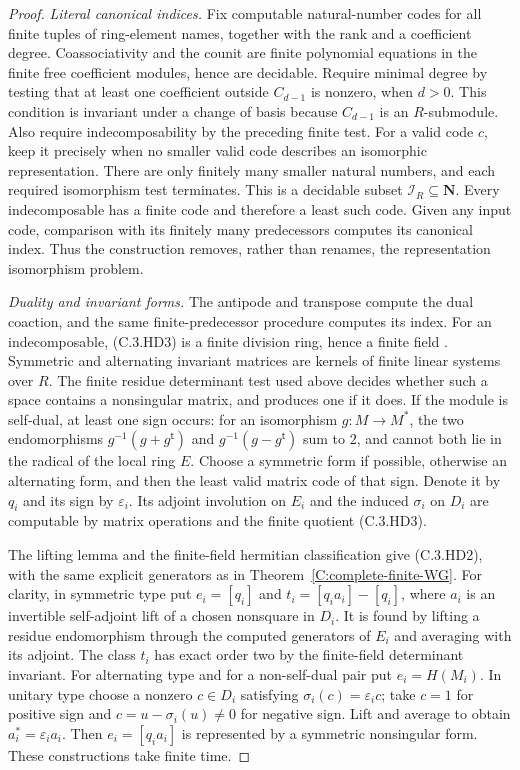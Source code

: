 \begin{proof}
\emph{Literal canonical indices.}
Fix computable natural-number codes for all finite tuples
of ring-element names, together with the rank and a
coefficient degree.  Coassociativity and the counit are
finite polynomial equations in the finite free coefficient
modules, hence are decidable.  Require minimal degree by
testing that at least one coefficient outside $C_{d-1}$
is nonzero, when $d>0$.  This condition is invariant under
a change of basis because $C_{d-1}$ is an $R$-submodule.
Also require indecomposability by the preceding finite test.
For a valid code $c$, keep it precisely when no smaller
valid code describes an isomorphic representation.
There are only finitely many smaller natural numbers,
and each required isomorphism test terminates.
This is a decidable subset $\mathscr I_R\subseteq\mathbf N$.
Every indecomposable has a finite code and therefore a
least such code.  Given any input code, comparison with
its finitely many predecessors computes its canonical
index.  Thus the construction removes, rather than
renames, the representation isomorphism problem.

\emph{Duality and invariant forms.}
The antipode and transpose compute the dual coaction,
and the same finite-predecessor procedure computes its
index.  For an indecomposable, (C.3.HD3) is a finite
division ring, hence a finite field
\cite[Theorem III.4.4, p.\ 29]{C-ArtinFiniteDivision}.
Symmetric and alternating invariant matrices are kernels
of finite linear systems over $R$.  The finite residue
determinant test used above decides whether such a space
contains a nonsingular matrix, and produces one if it does.
If the module is self-dual, at least one sign occurs:
for an isomorphism $g:M\to M^*$, the two endomorphisms
$g^{-1}(g+g^{\mathsf t})$ and
$g^{-1}(g-g^{\mathsf t})$ sum to $2$, and cannot both lie
in the radical of the local ring $E$.
Choose a symmetric form if possible, otherwise an
alternating form, and then the least valid matrix code
of that sign.  Denote it by $q_i$ and its sign by
$\varepsilon_i$.  Its adjoint involution on $E_i$ and
the induced $\sigma_i$ on $D_i$ are computable by matrix
operations and the finite quotient (C.3.HD3).

The lifting lemma and the finite-field hermitian
classification \cite[Lemma 3.1(a),(b)]{C-SergeichukFiniteForms}
give (C.3.HD2), with the same explicit generators as
in Theorem~\ref{C:complete-finite-WG}.
For clarity, in symmetric type put $e_i=[q_i]$ and
$t_i=[q_i a_i]-[q_i]$, where $a_i$ is an invertible
self-adjoint lift of a chosen nonsquare in $D_i$.
It is found by lifting a residue endomorphism through
the computed generators of $E_i$ and averaging with
its adjoint.  The class $t_i$ has exact order two by
the finite-field determinant invariant.
For alternating type and for a non-self-dual pair put
$e_i=H(M_i)$.  In unitary type choose a nonzero
$c\in D_i$ satisfying $\sigma_i(c)=\varepsilon_i c$;
take $c=1$ for positive sign and
$c=u-\sigma_i(u)\ne0$ for negative sign.
Lift and average to obtain $a_i^*=\varepsilon_i a_i$.
Then $e_i=[q_i a_i]$ is represented by a symmetric
nonsingular form.  These constructions take finite time.


\end{proof}
